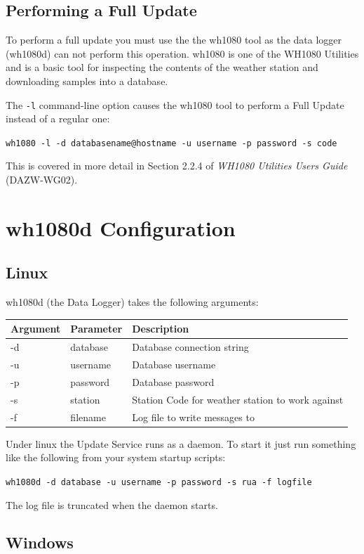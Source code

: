\documentclass[a4paper,10pt,draft]{book}
\begin{document}
\subsection{Performing a Full Update}
To perform a full update you must use the the wh1080 tool as the data logger (wh1080d) can not perform this operation. wh1080 is one of the WH1080 Utilities and is a basic tool for inspecting the contents of the weather station and downloading samples into a database.

The \verb|-l| command-line option causes the wh1080 tool to perform a Full Update instead of a regular one:

\verb|wh1080 -l -d databasename@hostname -u username -p password -s code|

This is covered in more detail in Section 2.2.4 of \emph{WH1080 Utilities Users Guide} (DAZW-WG02).

\section{wh1080d Configuration}
\subsection{Linux}

wh1080d (the Data Logger) takes the following arguments:

\begin{tabular}{l l p{10cm}}
\hline
\textbf{Argument} & \textbf{Parameter} & \textbf{Description} \\
\hline
-d & database & Database connection string \\
-u & username & Database username \\
-p & password & Database password \\
-s & station  & Station Code for weather station to work against \\
-f & filename & Log file to write messages to \\
\hline
\end{tabular}

Under linux the Update Service runs as a daemon. To start it just run something like the following from your system startup scripts:

\verb|wh1080d -d database -u username -p password -s rua -f logfile|

The log file is truncated when the daemon starts.

\subsection{Windows}
\end{document}
